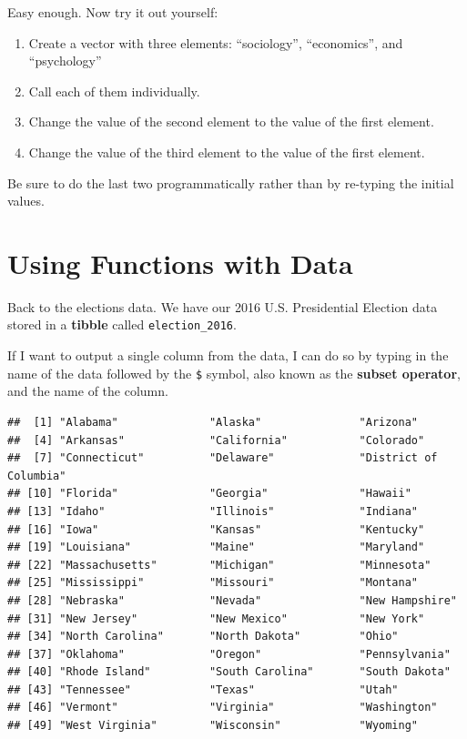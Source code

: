 \documentclass[
]{book}
\newenvironment{Shaded}{\begin{snugshade}}{\end{snugshade}}
\newcommand{\NormalTok}[1]{#1}
\newcommand{\SpecialCharTok}[1]{\textcolor[rgb]{0.81,0.36,0.00}{\textbf{#1}}}
\providecommand{\tightlist}{%
  \setlength{\itemsep}{0pt}\setlength{\parskip}{0pt}}
\begin{document}
Easy enough. Now try it out yourself:

\begin{enumerate}
\def\labelenumi{\arabic{enumi}.}
\tightlist
\item
  Create a vector with three elements: ``sociology'', ``economics'', and ``psychology''
\item
  Call each of them individually.
\item
  Change the value of the second element to the value of the first element.
\item
  Change the value of the third element to the value of the first element.
\end{enumerate}

Be sure to do the last two programmatically rather than by re-typing the initial values.

\hypertarget{using-functions-with-data}{%
\section{Using Functions with Data}\label{using-functions-with-data}}

Back to the elections data. We have our 2016 U.S. Presidential Election data stored in a \textbf{tibble} called \texttt{election\_2016}.

If I want to output a single column from the data, I can do so by typing in the name of the data followed by the \texttt{\$} symbol, also known as the \textbf{subset operator}, and the name of the column.

\begin{Shaded}
\end{Shaded}

\begin{verbatim}
##  [1] "Alabama"              "Alaska"               "Arizona"             
##  [4] "Arkansas"             "California"           "Colorado"            
##  [7] "Connecticut"          "Delaware"             "District of Columbia"
## [10] "Florida"              "Georgia"              "Hawaii"              
## [13] "Idaho"                "Illinois"             "Indiana"             
## [16] "Iowa"                 "Kansas"               "Kentucky"            
## [19] "Louisiana"            "Maine"                "Maryland"            
## [22] "Massachusetts"        "Michigan"             "Minnesota"           
## [25] "Mississippi"          "Missouri"             "Montana"             
## [28] "Nebraska"             "Nevada"               "New Hampshire"       
## [31] "New Jersey"           "New Mexico"           "New York"            
## [34] "North Carolina"       "North Dakota"         "Ohio"                
## [37] "Oklahoma"             "Oregon"               "Pennsylvania"        
## [40] "Rhode Island"         "South Carolina"       "South Dakota"        
## [43] "Tennessee"            "Texas"                "Utah"                
## [46] "Vermont"              "Virginia"             "Washington"          
## [49] "West Virginia"        "Wisconsin"            "Wyoming"
\end{verbatim}
\end{document}
